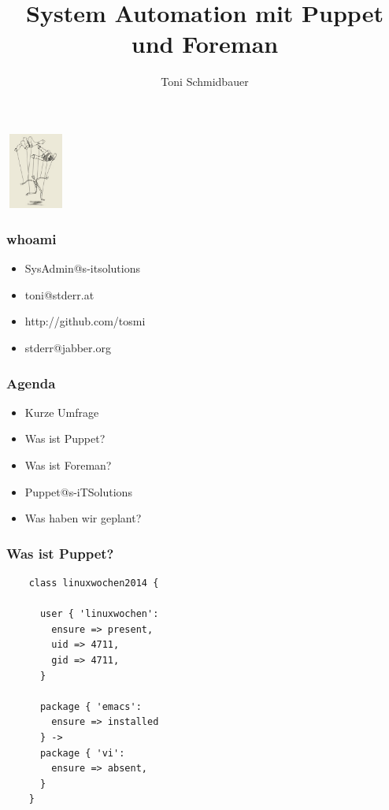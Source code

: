 \documentclass{beamer}
\title{System Automation mit Puppet und Foreman\\}
\author{Toni Schmidbauer}
\begin{document}
\begin{frame}
\center\includegraphics[height=2.5cm,width=2cm]{../pics/puppet.png}
\titlepage

\end{frame}

\begin{frame}
  \frametitle{whoami}
  \begin{itemize}
  \item SysAdmin@s-itsolutions
  \item toni@stderr.at
  \item http://github.com/tosmi
  \item stderr@jabber.org
  \end{itemize}
\end{frame}
\begin{frame}

  \frametitle{Agenda}

  \begin{itemize}
  \item Kurze Umfrage
  \item Was ist Puppet?
  \item Was ist Foreman?
  \item Puppet@s-iTSolutions
  \item Was haben wir geplant?
  \end{itemize}

\end{frame}

\begin{frame}
\end{frame}

\begin{frame}[fragile]
  \frametitle{Was ist Puppet?}

  \begin{lstlisting}
    class linuxwochen2014 {

      user { 'linuxwochen':
        ensure => present,
        uid => 4711,
        gid => 4711,
      }

      package { 'emacs':
        ensure => installed
      } ->
      package { 'vi':
        ensure => absent,
      }
    }
  \end{lstlisting}
\end{frame}
\end{document}
